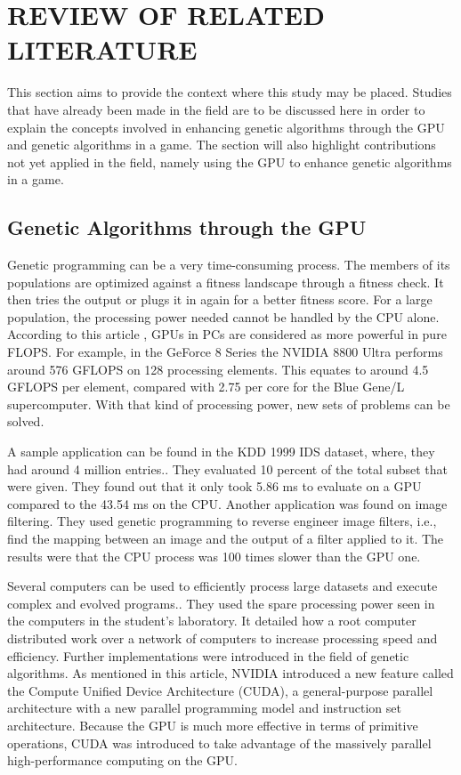 \chapter{REVIEW OF RELATED LITERATURE}

This section aims to provide the context where this study may be placed. 
Studies that have already been made in the field are to be discussed here in order to 
explain the concepts involved in enhancing genetic algorithms through the GPU and 
genetic algorithms in a game. The section will also highlight contributions not yet 
applied in the field, namely using the GPU to enhance genetic algorithms in a game.

\section{Genetic Algorithms through the GPU}

Genetic programming can be a very time-consuming process.  The members of its populations are optimized against a fitness landscape through a fitness check.  
It then tries the output or plugs it in again for a better fitness score. For a large population, the processing power needed cannot be handled by the CPU alone.  
According to this article , GPUs in PCs are considered as more powerful in pure FLOPS\cite{Banzhaf09}.  For example, in the GeForce 8 Series the NVIDIA 8800 Ultra performs around 576 GFLOPS 
on 128 processing elements.  This equates to around 4.5 GFLOPS per element, compared with 2.75 per core for the Blue Gene/L supercomputer.  With that kind of processing power, 
new sets of problems can be solved.  

A sample application can be found in the KDD 1999 IDS dataset, where, they had around 4 million entries.\cite{Banzhaf09}.  They evaluated 10 percent of the total subset that were given.  They 
found out that it only took 5.86 ms to evaluate on a GPU compared to the 43.54 ms on the CPU.  Another application was found on image filtering.  
They used genetic programming to reverse engineer image filters, i.e., find the mapping between an image and the output of a filter applied to it.  The results were that the CPU process 
was 100 times slower than the GPU one.  

Several computers can be used to efficiently process large datasets and execute complex and evolved programs.\cite{Harding09}.  
They used the spare processing power seen in the computers in the student's laboratory.  It detailed how a root computer distributed work over a network of computers to increase processing speed and efficiency.
Further implementations were introduced in the field of genetic algorithms.  As mentioned in this article, NVIDIA introduced a new feature called the Compute Unified Device Architecture (CUDA), 
a general-purpose parallel architecture with a new parallel programming model and instruction set architecture\cite{Zhang09}.  Because the GPU is much more effective in terms of primitive operations, 
CUDA was introduced to take advantage of the massively parallel high-performance computing on the GPU.  


